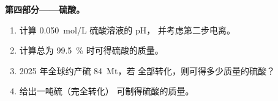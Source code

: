 \begin{problem}
\medskip
\noindent\textbf{第四部分——硫酸。}
\begin{enumerate}[resume]
  \item 计算 \qty{0.050}{mol/L} 硫酸溶液的 pH，
        并考虑第二步电离。
  \item 计算总为
        \qty{99.5}{\percent} 时可得硫酸的质量。
  \item 2025 年全球约产硫 \qty{84}{Mt}，若
        全部转化，则可得多少质量的硫酸？
  \item 给出一吨硫（完全转化）
        可制得硫酸的质量。
\end{enumerate}
\end{problem}
